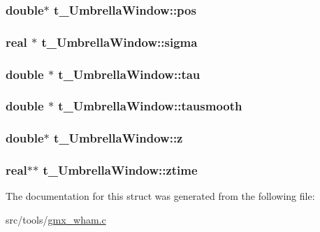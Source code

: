 \hypertarget{structt__UmbrellaWindow_ace1a860f95c6d3af285244aa15d3d172}{
\subsubsection[{pos}]{\setlength{\rightskip}{0pt plus 5cm}double$\ast$ {\bf t\-\_\-\-Umbrella\-Window\-::pos}}}\label{structt__UmbrellaWindow_ace1a860f95c6d3af285244aa15d3d172}
\hypertarget{structt__UmbrellaWindow_a1a05c3fee52599ab6f2641d6d8722228}{
\subsubsection[{sigma}]{\setlength{\rightskip}{0pt plus 5cm}real $\ast$ {\bf t\-\_\-\-Umbrella\-Window\-::sigma}}}\label{structt__UmbrellaWindow_a1a05c3fee52599ab6f2641d6d8722228}
\hypertarget{structt__UmbrellaWindow_ad5c2e3731763f34178516238fc2ca74b}{
\subsubsection[{tau}]{\setlength{\rightskip}{0pt plus 5cm}double $\ast$ {\bf t\-\_\-\-Umbrella\-Window\-::tau}}}\label{structt__UmbrellaWindow_ad5c2e3731763f34178516238fc2ca74b}
\hypertarget{structt__UmbrellaWindow_aadc18bb03dc382b3d7dfba51a455db56}{
\subsubsection[{tausmooth}]{\setlength{\rightskip}{0pt plus 5cm}double $\ast$ {\bf t\-\_\-\-Umbrella\-Window\-::tausmooth}}}\label{structt__UmbrellaWindow_aadc18bb03dc382b3d7dfba51a455db56}
\hypertarget{structt__UmbrellaWindow_a39fb82b3d8bed73ce85178d57c2d092f}{
\subsubsection[{z}]{\setlength{\rightskip}{0pt plus 5cm}double$\ast$ {\bf t\-\_\-\-Umbrella\-Window\-::z}}}\label{structt__UmbrellaWindow_a39fb82b3d8bed73ce85178d57c2d092f}
\hypertarget{structt__UmbrellaWindow_a01e6e5dfd5e0951eef4c6105a9d2342a}{
\subsubsection[{ztime}]{\setlength{\rightskip}{0pt plus 5cm}real$\ast$$\ast$ {\bf t\-\_\-\-Umbrella\-Window\-::ztime}}}\label{structt__UmbrellaWindow_a01e6e5dfd5e0951eef4c6105a9d2342a}


\-The documentation for this struct was generated from the following file\-:\begin{DoxyCompactItemize}
\item 
src/tools/\hyperlink{gmx__wham_8c}{gmx\-\_\-wham.\-c}\end{DoxyCompactItemize}
